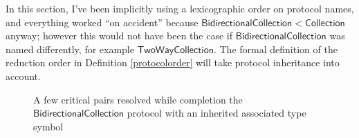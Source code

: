 \documentclass[headsepline,bibliography=totoc]{scrreport}
\newcommand{\namesym}[1]{\mathsf{#1}}
\newcommand{\proto}[1]{\bm{\mathsf{#1}}}
\newcommand{\protosym}[1]{[\proto{#1}]}
\newcommand{\assocsym}[2]{[\proto{#1}\colon\namesym{#2}]}
\theoremstyle{definition}
\theoremstyle{definition}
\theoremstyle{definition}
\begin{document}
In this section, I've been implicitly using a lexicographic order on protocol names, and everything worked ``on accident'' because $\proto{BidirectionalCollection}<\proto{Collection}$ anyway; however this would not have been the case if $\proto{BidirectionalCollection}$ was named differently, for example $\proto{TwoWayCollection}$. The formal definition of the reduction order in Definition \ref{protocolorder} will take protocol inheritance into account.

\begin{figure}\caption{A few critical pairs resolved while completion the $\proto{BidirectionalCollection}$ protocol with an inherited associated type symbol}\label{bidirectionalfig}
\begin{center}

\vspace{10mm}


\vspace{10mm}


\vspace{10mm}



\end{center}
\end{figure}
\end{document}
